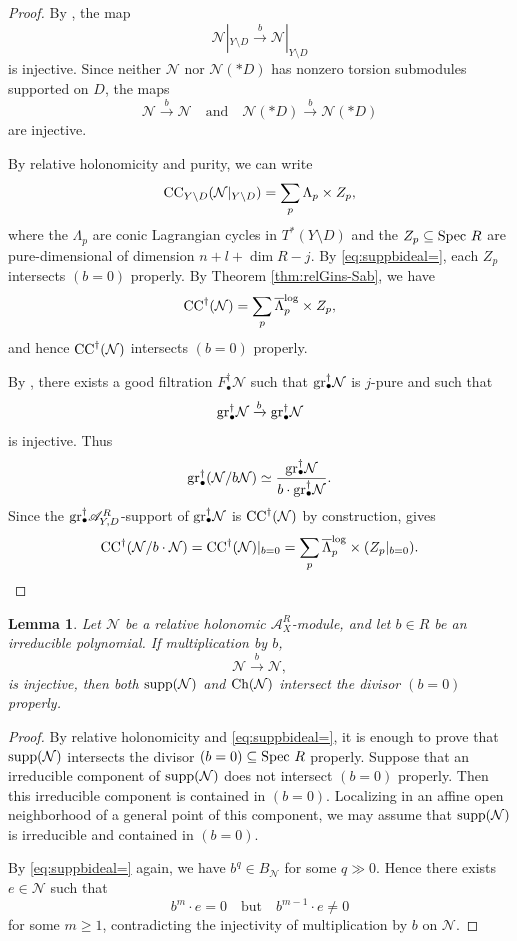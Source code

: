 \documentclass{amsart}
\theoremstyle{plain}
\numberwithin{theorem}{section}
\newtheorem{lemma}[theorem]{Lemma}
\theoremstyle{definition}
\theoremstyle{remark}
\theoremstyle{definition}
\newcommand{\La}{\Lambda}
\newcommand{\cN}{\mathcal{N}}
\newcommand{\gr}{\textup{gr}}
\newcommand{\sA}{\mathscr{A}}
\newcommand{\Spec}{\textup{Spec }}
\newcommand{\supp}{\textup{supp}}
\newcommand{\Ch}{\textup{Ch}}
\newcommand{\CC}{\textup{CC}}
\begin{document}
\begin{proof}
By \cite[Lem. 3.4.2]{BVWZ}, the map
\[
\cN|_{Y\setminus D}\xrightarrow{b}\cN|_{Y\setminus D}
\]
is injective. Since neither $\cN$ nor $\cN(*D)$ has nonzero torsion submodules supported on $D$, the maps
\[
\cN\xrightarrow{b}\cN
\quad \text{and} \quad
\cN(*D)\xrightarrow{b}\cN(*D)
\]
are injective.

By relative holonomicity and purity, we can write
\[
\CC_{Y\setminus D}(\cN|_{Y\setminus D})
=
\sum_p \La_p\times Z_p,
\]
where the $\La_p$ are conic Lagrangian cycles in $T^*(Y\setminus D)$ and the $Z_p\subseteq \Spec R$ are pure-dimensional of dimension
$n+l+\dim R-j.$
By \eqref{eq:suppbideal=}, each $Z_p$ intersects $(b=0)$ properly. By Theorem \ref{thm:relGins-Sab}, we have
\[
\CC^\dagger(\cN)
=
\sum_p \overline{\La}^{\log}_p\times Z_p,
\]
and hence $\CC^\dagger(\cN)$ intersects $(b=0)$ properly.

By \cite[Prop.4.4.1]{BVWZ}, there exists a good filtration $F^\dagger_\bullet\cN$ such that $\gr^\dagger_\bullet\cN$ is $j$-pure and such that
\[
\gr^\dagger_\bullet\cN
\xrightarrow{b}
\gr^\dagger_\bullet\cN
\]
is injective. Thus
\[
\gr^\dagger_\bullet(\cN/b\cN)
\simeq
\frac{\gr^\dagger_\bullet\cN}
{b\cdot\gr^\dagger_\bullet\cN}.
\]
Since the $\gr^\dagger_\bullet\sA^R_{Y,D}$-support of $\gr^\dagger_\bullet\cN$ is $\CC^\dagger(\cN)$ by construction, \cite[Prop.1.5.3]{Gil} gives
\[
\CC^\dagger(\cN/b\cdot\cN)
=
\CC^\dagger(\cN)|_{b=0}
=
\sum_p \overline{\La}^{\log}_p\times (Z_p|_{b=0}).
\]
\end{proof}

\begin{lemma}\label{lm:injimplyproint}
Let $\cN$ be a relative holonomic $\sA_X^R$-module, and let $b\in R$ be an irreducible polynomial. If multiplication by $b$,
\[
\cN\xrightarrow{b}\cN,
\]
is injective, then both $\supp(\cN)$ and $\Ch(\cN)$ intersect the divisor $(b=0)$ properly.
\end{lemma}

\begin{proof}
By relative holonomicity and \eqref{eq:suppbideal=}, it is enough to prove that $\supp(\cN)$ intersects the divisor $(b=0)\subseteq \Spec R$ properly. Suppose that an irreducible component of $\supp(\cN)$ does not intersect $(b=0)$ properly. Then this irreducible component is contained in $(b=0)$. Localizing in an affine open neighborhood of a general point of this component, we may assume that $\supp(\cN)$ is irreducible and contained in $(b=0)$.

By \eqref{eq:suppbideal=} again, we have $b^q\in B_\cN$ for some $q\gg 0$. Hence there exists $e\in \cN$ such that
\[
b^m\cdot e=0
\quad \text{but} \quad
b^{m-1}\cdot e\neq 0
\]
for some $m\ge 1$, contradicting the injectivity of multiplication by $b$ on $\cN$.
\end{proof}
\end{document}
